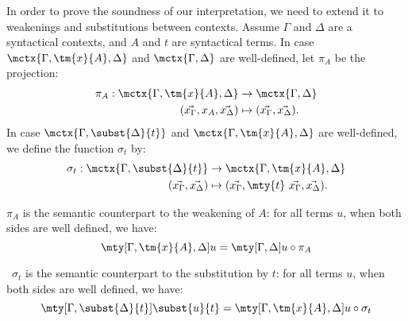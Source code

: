In order to prove the soundness of our interpretation, we need to extend it to weakenings
and substitutions between contexts.
%
Assume \( \Gamma \) and \( \Delta \) are a syntactical contexts, and \( A \) and \( t \)
are syntactical terms.
%
In case \( \mctx{\Gamma, \tm{x}{A}, \Delta} \) and \( \mctx{\Gamma, \Delta} \) are well-defined,
let \( \pi_A \) be the projection:
{\small
\[
  \begin{split}
  \pi_A : \mctx{\Gamma, \tm{x}{A}, \Delta} & \to \mctx{\Gamma, \Delta} \\
  (\vec{x_\Gamma}, x_A, \vec{x_\Delta}) & \mapsto (\vec{x_\Gamma}, \vec{x_\Delta}).
  \end{split}
\]
}
In case \( \mctx{\Gamma, \subst{\Delta}{t}} \) and \( \mctx{\Gamma, \tm{x}{A}, \Delta} \) are
well-defined, we define the function \( \sigma_t \) by:
{\small
\[
  \begin{split}
    \sigma_t : \mctx{\Gamma, \subst{\Delta}{t}} & \to \mctx{\Gamma, \tm{x}{A}, \Delta} \\
    (\vec{x_\Gamma}, \vec{x_\Delta}) & \mapsto (\vec{x_\Gamma}, \mty{t}\ \vec{x_\Gamma}, \vec{x_\Delta}).
  \end{split}
\]
}
%
\begin{lemma}[Weakening]\label{lem:weakening}
  \( \pi_A \) is the semantic counterpart to the weakening of \( A \): for all terms \( u \),
  when both sides are well defined, we have:
  {\small
\[
    \mty[{\Gamma, \tm{x}{A}, \Delta}]{u} = \mty[{\Gamma, \Delta}]{u} \circ \pi_A
  \]}
\end{lemma}
%
\begin{lemma}[Substitution]\label{lem:substitution}\ \( \sigma_t \) is the semantic counterpart to the substitution by \( t \):
  for all terms \( u \), when both sides are well defined, we have:
  {\small
\[
    \mty[{\Gamma, \subst{\Delta}{t}}]{\subst{u}{t}} = \mty[{\Gamma, \tm{x}{A}, \Delta}]{u} \circ \sigma_t
  \]}
\end{lemma}

